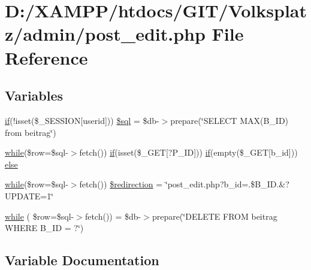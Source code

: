 \hypertarget{post__edit_8php}{}\section{D\+:/\+X\+A\+M\+P\+P/htdocs/\+G\+I\+T/\+Volksplatz/admin/post\+\_\+edit.php File Reference}
\label{post__edit_8php}
\subsection*{Variables}
\begin{DoxyCompactItemize}
\item 
\mbox{\hyperlink{view__all_8php_ac0971e25a4f61580752c758ef520f6b2}{if}}(!isset(\$\+\_\+\+S\+E\+S\+S\+I\+ON\mbox{[}\textquotesingle{}userid\textquotesingle{}\mbox{]})) \mbox{\hyperlink{post__edit_8php_aab49ff17e1868c1b827697652546d991}{\$sql}} = \$db-\/$>$prepare(\char`\"{}S\+E\+L\+E\+CT M\+AX(B\+\_\+\+ID) from beitrag\char`\"{})
\item 
\mbox{\hyperlink{showpost_8php_a0074fdcf62116989383290ee4de5f453}{while}}(\$row=\$sql-\/$>$fetch()) \mbox{\hyperlink{view__all_8php_ac0971e25a4f61580752c758ef520f6b2}{if}}(isset(\$\+\_\+\+G\+ET\mbox{[}\textquotesingle{}?P\+\_\+\+ID\textquotesingle{}\mbox{]})) \mbox{\hyperlink{view__all_8php_ac0971e25a4f61580752c758ef520f6b2}{if}}(empty(\$\+\_\+\+G\+ET\mbox{[}\textquotesingle{}b\+\_\+id\textquotesingle{}\mbox{]})) \mbox{\hyperlink{post__edit_8php_af8a1581e315d0050b1cb47595141d2da}{else}}
\item 
\mbox{\hyperlink{showpost_8php_a0074fdcf62116989383290ee4de5f453}{while}}(\$row=\$sql-\/$>$fetch()) \mbox{\hyperlink{post__edit_8php_a79eea928811ed14372640e5aff6d30a6}{\$redirection}} = \textquotesingle{}\char`\"{}post\+\_\+edit.\+php?b\+\_\+id=\textquotesingle{}.\$B\+\_\+\+I\+D.\textquotesingle{}\&?U\+P\+D\+A\+TE=1\char`\"{}\textquotesingle{}
\item 
\mbox{\hyperlink{post__edit_8php_ad9f0ace87466451425c3060bd8b7aa60}{while}} ( \$row=\$sql-\/$>$fetch()) = \$db-\/$>$prepare(\char`\"{}D\+E\+L\+E\+TE F\+R\+OM beitrag W\+H\+E\+RE B\+\_\+\+ID = ?\char`\"{})
\end{DoxyCompactItemize}


\subsection{Variable Documentation}
\mbox{\label{post__edit_8php_a79eea928811ed14372640e5aff6d30a6}} 
